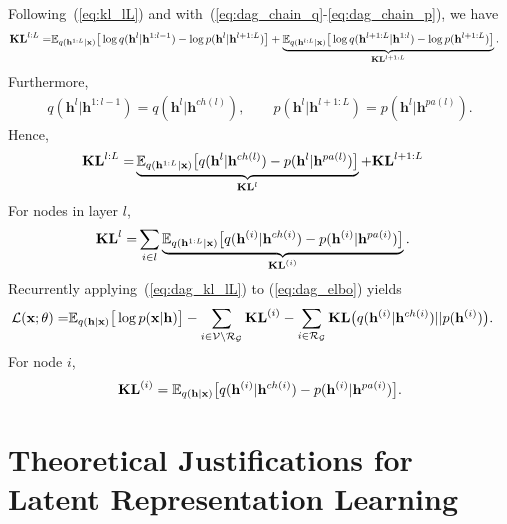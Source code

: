 \documentclass{article}
\begin{document}
Following~(\ref{eq:kl_lL}) and with~(\ref{eq:dag_chain_q}-\ref{eq:dag_chain_p}), we have 
 \begin{align} \notag
\textbf{\text{KL}}^{l:L} 
=&  \mathbb{E}_{q(\mathbf{h}^{1:L}|\mathbf{x})}\big[  \log q(\mathbf{h}^{l}|\mathbf{h}^{1:l-1})   - \log p(\mathbf{h}^{l}|\mathbf{h}^{l+1:L}) \big] + \underbrace{\mathbb{E}_{q(\mathbf{h}^{l:L}|\mathbf{x})}\big[  \log q(\mathbf{h}^{l+1:L}|\mathbf{h}^{1:l})- \log p(\mathbf{h}^{l+1:L})  \big]}_{\mathbf{KL}^{l+1:L}}.
\end{align}
Furthermore,
\begin{align*} 
q(\mathbf{h}^{l}|\mathbf{h}^{1:l-1})=q(\mathbf{h}^{l}|\mathbf{h}^{ch(l)}), \quad  \quad   p(\mathbf{h}^{l}|\mathbf{h}^{l+1:L}) = p(\mathbf{h}^{l}|\mathbf{h}^{pa(l)}).
\end{align*}
Hence,
 \begin{align} \label{eq:dag_kl_lL}
\textbf{\text{KL}}^{l:L} 
=&  \underbrace{\mathbb{E}_{q(\mathbf{h}^{1:L}|\mathbf{x})}\big[  q(\mathbf{h}^{l}|\mathbf{h}^{ch(l)})  - p(\mathbf{h}^{l}|\mathbf{h}^{pa(l)}) \big]}_{\textbf{\text{KL}}^{l}} +\textbf{\text{KL}}^{l+1:L} 
\end{align}
For nodes in layer $l$,
\begin{align} \notag
\textbf{\text{KL}}^{l} =& \sum_{i \in l} \underbrace{\mathbb{E}_{q(\mathbf{h}^{1:L}|\mathbf{x})}\big[  q(\mathbf{h}^{(i)}|\mathbf{h}^{ch(i)})  - p(\mathbf{h}^{(i)}|\mathbf{h}^{pa(i)}) \big]}_{\textbf{\text{KL}}^{(i)}} .
\end{align}
Recurrently applying~(\ref{eq:dag_kl_lL}) to (\ref{eq:dag_elbo}) yields
\begin{align}\notag %
\mathcal{L}(\mathbf{x}; \theta) =& \mathbb{E}_{q(\mathbf{h}|\mathbf{x})}\big[ \log p(\mathbf{x}|\mathbf{h})  \big] -  \sum_{i \in \mathcal{V}  \setminus  \mathcal{R}_{ \mathcal{G} }} \textbf{\text{KL}}^{(i)} -    \sum_{i \in  \mathcal{R}_{ \mathcal{G} }  }  \textbf{\text{KL}}\big(q(\mathbf{h}^{(i)} | \mathbf{h}^{ch(i)} )   || p(\mathbf{h}^{(i)})  \big) .
\end{align}
For node $i$, 
$$\textbf{\text{KL}}^{(i)} = \mathbb{E}_{q(\mathbf{h}|\mathbf{x})}\big[  q(\mathbf{h}^{(i)}|\mathbf{h}^{ch(i)})  - p(\mathbf{h}^{(i)}|\mathbf{h}^{pa(i)}) \big].$$



\section{Theoretical Justifications for Latent Representation Learning}\label{sec:theory}
\end{document}
